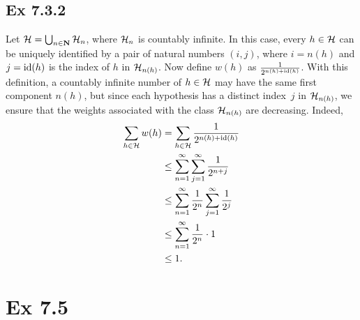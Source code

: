 \subsection*{Ex 7.3.2}

Let $\mathcal{H} = \bigcup_{n \in \mathbf{N}} \mathcal{H}_n$, where $\mathcal{H}_n$ is countably infinite.
In this case, every $h \in \mathcal{H}$ can be uniquely identified by a pair of natural numbers
$(i, j)$, where $i = n(h)$ and $j = \operatorname{id} (h)$ is the index of $h$ in $\mathcal{H}_{ n(h) }$. Now define $w(h)$ 
as $\frac{1}{2^{n(h) + \operatorname{id}(h)}}$. With this definition, a countably infinite number of $h \in \mathcal{H}$
may have the same first component $n(h)$, but since each hypothesis 
has a distinct index~$j$ in $\mathcal{H}_{n(h)}$, we ensure that the weights associated 
with the class $\mathcal{H}_{n(h)}$ are decreasing. Indeed, 
\begin{align*}
    \sum_{h \in \mathcal{H}} w(h) & = \sum_{h \in \mathcal{H}} \frac{1}{2^{n(h) + \operatorname{id}(h)}} \\
        & \leq \sum_{n = 1}^{\infty} \sum_{j = 1}^{\infty} \frac{1}{2^{n + j}} \\
        & \leq \sum_{n = 1}^{\infty} \frac{1}{2^n} \sum_{j = 1}^{\infty} \frac{1}{2^j} \\
        & \leq \sum_{n = 1}^{\infty} \frac{1}{2^n} \cdot 1 \\
        & \leq 1.
\end{align*}

\section*{Ex 7.5}

